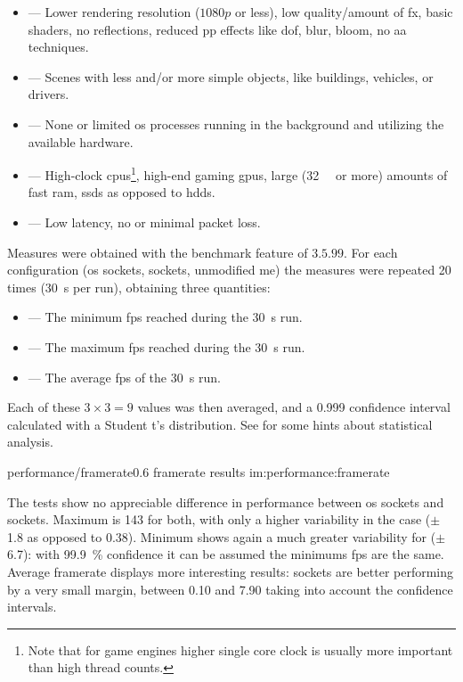 \begin{itemize}
	\item {} --- Lower rendering resolution ($1080p$ or less), low quality/amount of \gls{fx}, basic shaders, no reflections, reduced \gls{pp} effects like \gls{dof}, blur, bloom, no \gls{aa} techniques.
	\item {} --- Scenes with less and/or more simple objects, like buildings, vehicles, or drivers.
	\item {} --- None or limited \gls{os} processes running in the background and utilizing the available hardware.
	\item {} --- High-clock \glspl{cpu}\footnote{Note that for game engines higher single core clock is usually more important than high thread counts.}, high-end gaming \glspl{gpu}, large (\SI{32}{\giga\byte} or more) amounts of fast \gls{ram}, \glspl{ssd} as opposed to \glspl{hdd}.
	\item {} --- Low latency, no or minimal packet loss.
\end{itemize}

Measures were obtained with the benchmark feature of  $3.5.99$. For each configuration (\gls{os} sockets,  sockets, unmodified \gls{me}) the measures were repeated \num{20} times (\SI{30}{\second} per run), obtaining three quantities:

\begin{itemize}
	\item {} --- The minimum \gls{fps} reached during the \SI{30}{\second} run.
	\item {} --- The maximum \gls{fps} reached during the \SI{30}{\second} run.
	\item {} --- The average \gls{fps} of the \SI{30}{\second} run.
\end{itemize}

\FLOATnoindent Each of these $3\times3=9$ values was then averaged, and a \num{0,999} confidence interval calculated with a Student t's distribution. See  for some hints about statistical analysis.

\begin{image}
	{performance/framerate}{0.6}
	{framerate results}
	{im:performance:framerate}
	{}
\end{image} %

The tests show no appreciable difference in performance between \gls{os} sockets and  sockets. Maximum is \SI{143}{\fps} for both, with only a higher variability in the  case ($\pm$\SI{1,8}{\fps} as opposed to \SI{0,38}{\fps}). Minimum shows again a much greater variability for  ($\pm$\SI{6,7}{\fps}): with \SI{99,9}{\percent} confidence it can be assumed the minimums \gls{fps} are the same. Average \gls{framerate} displays more interesting results:  sockets are better performing by a very small margin, between \SI{0,10}{\fps} and \SI{7,90}{\fps} taking into account the confidence intervals.

